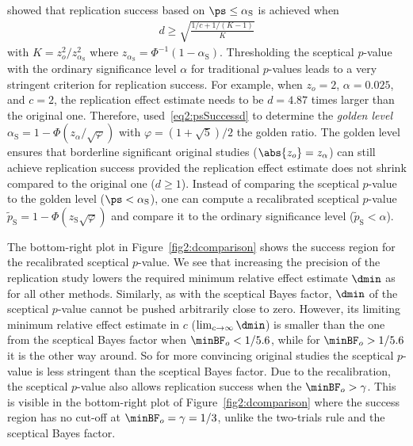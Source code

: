 \citet{Held2021} showed that replication success based on
$\ps \leq \alpha_{\mathrm{S}}$ is achieved when
\begin{align}
  \label{eq2:psSuccessd}
  d \geq \sqrt{\frac{1/c + 1/(K - 1)}{K}}
\end{align}
with $K = z_{o}^{2}/z_{\alpha_{\mathrm{S}}}^{2}$ where
$z_{\alpha_{\mathrm{S}}} = \Phi^{-1}(1 - \alpha_{\mathrm{S}})$. Thresholding the
sceptical $p$-value with the ordinary significance level $\alpha$ for
traditional $p$-values leads to a very stringent criterion for replication
success. For example, when $z_{o} = 2$, $\alpha = 0.025$, and
$c = 2$, the replication effect estimate needs to be
$d = 4.87$ times larger than the original one. Therefore,
\citet{Held2021} used~\eqref{eq2:psSuccessd} to determine the \emph{golden level}
$\alpha_{\mathrm{S}} = 1 - \Phi(z_\alpha/\sqrt{\varphi})$ with
$\varphi = (1 + \sqrt{5})/2$ the golden ratio. The golden level ensures that
borderline significant original studies ($\abs{z_{o}} = z_{\alpha}$) can still
achieve replication success provided the replication effect estimate does not
shrink compared to the original one ($d \geq 1$). Instead of comparing the
sceptical $p$-value to the golden level ($\ps < \alpha_{\mathrm{S}}$), one can
compute a recalibrated sceptical $p$-value
$\tilde{p}_{\mathrm{S}} = 1 - \Phi(z_{\mathrm{S}} \sqrt{\varphi})$ and compare it to
the ordinary significance level ($\tilde{p}_{\mathrm{S}} < \alpha$).

The bottom-right plot in Figure~\ref{fig2:dcomparison} shows the success region
for the recalibrated sceptical \mbox{$p$-value}. We see that increasing the
precision of the replication study lowers the required minimum relative effect
estimate $\dmin$ as for all other methods. Similarly, as with the sceptical
Bayes factor, $\dmin$ of the sceptical $p$-value cannot be pushed arbitrarily
close to zero. However, its limiting minimum relative effect estimate in $c$
($\lim_{c \to \infty}\dmin$) is smaller than the one from the sceptical Bayes
factor when $\minBF_{o} < 1/5.6$, while for $\minBF_{o} > 1/5.6$ it is the other
way around. So for more convincing original studies the sceptical $p$-value is
less stringent than the sceptical Bayes factor. Due to the recalibration, the
sceptical $p$-value also allows replication success when the
$\minBF_{o} > \gamma$. This is visible in the bottom-right plot of
Figure~\ref{fig2:dcomparison} where the success region has no cut-off at
$\minBF_{o} = \gamma = 1/3$, unlike the two-trials rule and the sceptical Bayes
factor.

